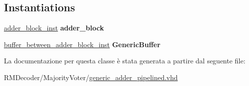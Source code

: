 \subsection*{Instantiations}
 \begin{DoxyCompactItemize}
\item 
\hypertarget{classgeneric__adder__pipelined_1_1_structural_a01e4a388689526e6424aff00490f0833}{\hyperlink{classgeneric__adder__pipelined_1_1_structural_a01e4a388689526e6424aff00490f0833}{adder\+\_\+block\+\_\+inst}  {\bfseries adder\+\_\+block}   }\label{classgeneric__adder__pipelined_1_1_structural_a01e4a388689526e6424aff00490f0833}

\item 
\hypertarget{classgeneric__adder__pipelined_1_1_structural_af4726a25a81a887cdc74980f2ea53432}{\hyperlink{classgeneric__adder__pipelined_1_1_structural_af4726a25a81a887cdc74980f2ea53432}{buffer\+\_\+between\+\_\+adder\+\_\+block\+\_\+inst}  {\bfseries Generic\+Buffer}   }\label{classgeneric__adder__pipelined_1_1_structural_af4726a25a81a887cdc74980f2ea53432}

\end{DoxyCompactItemize}


La documentazione per questa classe è stata generata a partire dal seguente file\+:\begin{DoxyCompactItemize}
\item 
R\+M\+Decoder/\+Majority\+Voter/\hyperlink{generic__adder__pipelined_8vhd}{generic\+\_\+adder\+\_\+pipelined.\+vhd}\end{DoxyCompactItemize}
